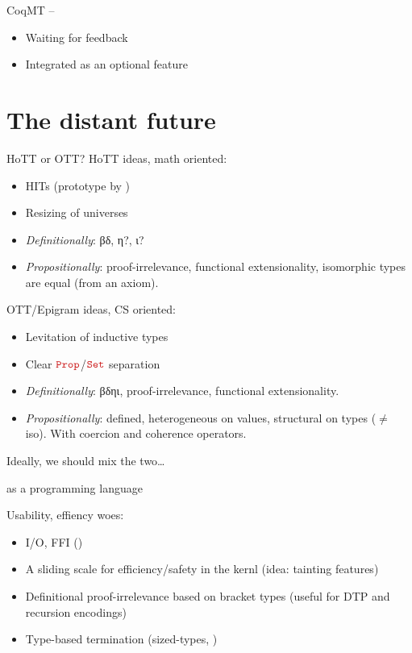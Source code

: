 \begin{subsecframe}{CoqMT -- }
  \begin{itemize}
  \item Waiting for feedback
  \item Integrated as an optional feature
  \end{itemize}
\end{subsecframe}  

\section{The distant future}

\begin{subsecframe}{HoTT or OTT?}
  HoTT ideas, math oriented:
  \begin{itemize}
  \item HITs (prototype by )
  \item Resizing of universes
  \item \alert{\emph{Definitionally}}: βδ, η?, ι? 
  \item \alert{\emph{Propositionally}}: proof-irrelevance, functional extensionality,
    isomorphic types are equal (from an axiom).
  \end{itemize}
  
  OTT/Epigram ideas, CS oriented:
  \begin{itemize}
  \item Levitation of inductive types
  \item Clear $\Prop$/$\Set$ separation
  \item \alert{\emph{Definitionally}}: βδηι, proof-irrelevance, functional
    extensionality.
  \item \alert{\emph{Propositionally}}: defined, heterogeneous on
    values, structural on types ($\neq$ iso). 
    With coercion and coherence operators.
  \end{itemize}

  Ideally, we should mix the two\dots
\end{subsecframe}

\begin{subsecframe}{\Coq as a programming language}

  Usability, effiency woes:
  \begin{itemize}
  \item I/O, FFI ()
  \item A sliding scale for efficiency/safety in the kernl (idea:
    tainting features)
  \item Definitional proof-irrelevance based on bracket types (useful
    for DTP and recursion encodings)
  \item Type-based termination (sized-types, )
  \end{itemize}
\end{subsecframe}


